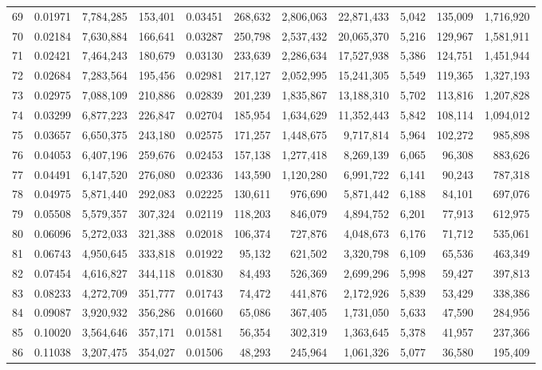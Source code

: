 \begin{landscape}
\begin{longtable}{rrrrrrrrrrr}
69 & 0.01971 & 7,784,285 & 153,401 & 0.03451 & 268,632 & 2,806,063 & 22,871,433 & 5,042 & 135,009 & 1,716,920 \\
70 & 0.02184 & 7,630,884 & 166,641 & 0.03287 & 250,798 & 2,537,432 & 20,065,370 & 5,216 & 129,967 & 1,581,911 \\
71 & 0.02421 & 7,464,243 & 180,679 & 0.03130 & 233,639 & 2,286,634 & 17,527,938 & 5,386 & 124,751 & 1,451,944 \\
72 & 0.02684 & 7,283,564 & 195,456 & 0.02981 & 217,127 & 2,052,995 & 15,241,305 & 5,549 & 119,365 & 1,327,193 \\
73 & 0.02975 & 7,088,109 & 210,886 & 0.02839 & 201,239 & 1,835,867 & 13,188,310 & 5,702 & 113,816 & 1,207,828 \\
74 & 0.03299 & 6,877,223 & 226,847 & 0.02704 & 185,954 & 1,634,629 & 11,352,443 & 5,842 & 108,114 & 1,094,012 \\
75 & 0.03657 & 6,650,375 & 243,180 & 0.02575 & 171,257 & 1,448,675 & 9,717,814 & 5,964 & 102,272 & 985,898 \\
76 & 0.04053 & 6,407,196 & 259,676 & 0.02453 & 157,138 & 1,277,418 & 8,269,139 & 6,065 & 96,308 & 883,626 \\
77 & 0.04491 & 6,147,520 & 276,080 & 0.02336 & 143,590 & 1,120,280 & 6,991,722 & 6,141 & 90,243 & 787,318 \\
78 & 0.04975 & 5,871,440 & 292,083 & 0.02225 & 130,611 & 976,690 & 5,871,442 & 6,188 & 84,101 & 697,076 \\
79 & 0.05508 & 5,579,357 & 307,324 & 0.02119 & 118,203 & 846,079 & 4,894,752 & 6,201 & 77,913 & 612,975 \\
80 & 0.06096 & 5,272,033 & 321,388 & 0.02018 & 106,374 & 727,876 & 4,048,673 & 6,176 & 71,712 & 535,061 \\
81 & 0.06743 & 4,950,645 & 333,818 & 0.01922 & 95,132 & 621,502 & 3,320,798 & 6,109 & 65,536 & 463,349 \\
82 & 0.07454 & 4,616,827 & 344,118 & 0.01830 & 84,493 & 526,369 & 2,699,296 & 5,998 & 59,427 & 397,813 \\
83 & 0.08233 & 4,272,709 & 351,777 & 0.01743 & 74,472 & 441,876 & 2,172,926 & 5,839 & 53,429 & 338,386 \\
84 & 0.09087 & 3,920,932 & 356,286 & 0.01660 & 65,086 & 367,405 & 1,731,050 & 5,633 & 47,590 & 284,956 \\
85 & 0.10020 & 3,564,646 & 357,171 & 0.01581 & 56,354 & 302,319 & 1,363,645 & 5,378 & 41,957 & 237,366 \\
86 & 0.11038 & 3,207,475 & 354,027 & 0.01506 & 48,293 & 245,964 & 1,061,326 & 5,077 & 36,580 & 195,409 \\

\end{longtable}
\end{landscape}
